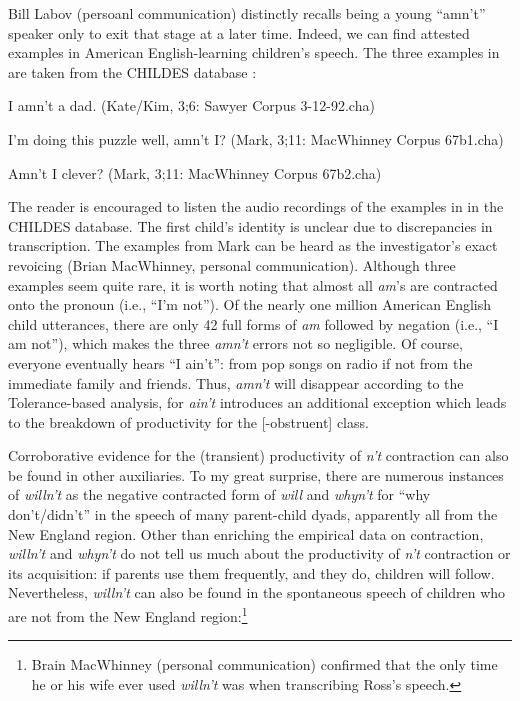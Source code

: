 \documentclass[output=paper,
modfonts
]{LSP/langsci}
\begin{document}
Bill Labov (persoanl communication) distinctly recalls being a young
``amn't'' speaker only to exit that stage at a later time.
Indeed, we can find attested examples in American English-learning children's
speech.  
The three examples in  are taken from the CHILDES
database \citep{CHILDES}: 

\begin{exe} \ex \label{amnt}
\begin{xlist} 
\item I amn't a dad. (Kate/Kim, 3;6: Sawyer Corpus 3-12-92.cha) \label{katekim}
\item I'm doing this puzzle well, amn't I? (Mark, 3;11: MacWhinney
  Corpus 67b1.cha)
\item Amn't I clever? (Mark, 3;11: MacWhinney Corpus 67b2.cha)
\end{xlist} \end{exe}

The reader is encouraged to listen the
  audio recordings of the examples in   in the CHILDES
  database. The first child's 
identity is unclear due to discrepancies in transcription. The examples
from Mark can be heard as the investigator's  exact
revoicing (Brian MacWhinney, personal communication). Although three
examples seem quite rare, it is worth noting that almost all \textit{am}'s are contracted onto the pronoun (i.e., ``I'm not''). Of the
nearly one million American English child utterances, there are only 42
full forms of \textit{am} followed by negation (i.e., ``I am not''),
which makes the three \textit{amn't} errors not so negligible.
Of course, everyone eventually hears ``I ain't'': from pop songs on
radio if not from the immediate family and friends. Thus,
 \textit{amn't} will disappear according to the Tolerance-based
analysis, for \textit{ain't} introduces an additional exception which leads to
the breakdown of productivity for the [-obstruent] class.

Corroborative  evidence for the (transient) productivity of \textit{n't} contraction can also be found in other auxiliaries. 
To my great
surprise, there are  numerous instances of \textit{willn't} as the negative
contracted form of \textit{will} and \textit{whyn't} for ``why
  don't/didn't'' in the speech of  many parent-child dyads, apparently
  all from   the New 
England region.  Other than enriching the empirical data on
contraction, \textit{willn't} and \textit{whyn't} do not tell us much about the
productivity of \textit{n't} contraction or its acquisition: if parents
use them frequently, and they do,  children will follow. Nevertheless,
\textit{willn't} can also be found in the spontaneous speech of children who
are not from the New England region:\footnote{Brain MacWhinney (personal
  communication) confirmed
  that the only time he or his wife ever used \textit{willn't} was  when
transcribing   Ross's speech. }
\end{document}
